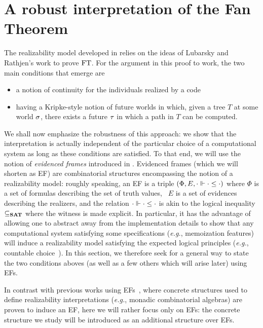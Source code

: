 \documentclass[a4paper,UKenglish,cleveref, autoref, thm-restate]{lipics-v2021}
\begin{document}
\section{A robust interpretation of the Fan Theorem}
\label{s:robust}
The realizability model developed in  relies on the ideas
of Lubarsky and Rathjen's work \cite{LubRat13} to prove $\mathrm{FT}$.
For the argument in this proof to work, the two main conditions that emerge are
\begin{itemize}
\item a notion of continuity for the individuals realized by a code %
\item having a Kripke-style notion of future worlds in which, given a tree $T$ at some world $\sigma$,
there exists a future $\tau$ in which a path in $T$ can be computed.
\end{itemize}
We shall now emphasize the robustness of this approach: we show that the interpretation
is actually independent of the particular choice of a computational system as long as these conditions are satisfied.
To that end, we will use the notion of \emph{evidenced frames} introduced in \cite{CohMiqTat21}.
Evidenced frames (which we will shorten as EF) are combinatorial structures encompassing
the notion of a realizability model:
roughly speaking, an EF is a triple $( \Phi, E, \cdot \Vdash \cdot \leq \cdot )$
where $\Phi$ is a set of formulas describing the set of truth values,
~$E$ is a set of evidences describing the realizers,
and the relation $\cdot \Vdash \cdot \leq \cdot$ is akin to the logical inequality $\subseteq_{{\mathbf{SAT}}}$
where the witness is made explicit.
In particular, it has the advantage of allowing one to abstract away
from the implementation details to show that any computational system satisfying
some specifications (\emph{e.g.}, memoization features) will induce a realizability model
satisfying the expected logical principles (\emph{e.g.}, countable choice~\cite{CohMiqTat21}).
In this section, we therefore seek for a general way to state the two conditions aboves
(as well as a few others which will arise later) using EFs.

In contrast with previous works using EFs~\cite{CohMiqTat21,GarMiq23,CohGruKirMiq25EffHOL,
CohGruKirMiq25mca}, where concrete structures used to define realizability interpretations
(\textit{e.g.}, monadic combinatorial algebras) are proven to induce an EF,
here we will rather focus only on EFs:
the concrete structure we study will be introduced as an additional structure
over EFs.
\end{document}
